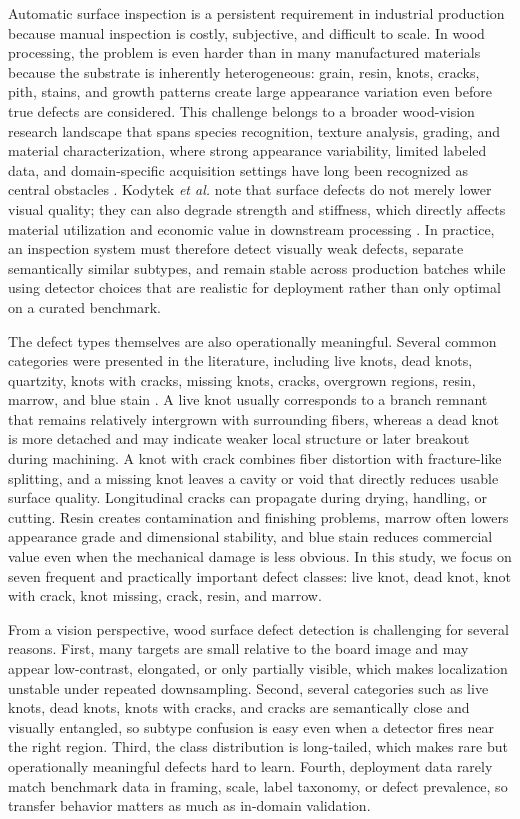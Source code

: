 \documentclass[10pt,a4paper]{article}
\begin{document}
Automatic surface inspection is a persistent requirement in industrial production because manual inspection is costly, subjective, and difficult to scale. In wood processing, the problem is even harder than in many manufactured materials because the substrate is inherently heterogeneous: grain, resin, knots, cracks, pith, stains, and growth patterns create large appearance variation even before true defects are considered. This challenge belongs to a broader wood-vision research landscape that spans species recognition, texture analysis, grading, and material characterization, where strong appearance variability, limited labeled data, and domain-specific acquisition settings have long been recognized as central obstacles \citep{hwang_sugiyama_review,da_silva_2017,souza_2020,de_geus_2021,kirbas_2022,he_2021_woodresearch,herrera_poyatos_2024}. Kodytek \textit{et al.} note that surface defects do not merely lower visual quality; they can also degrade strength and stiffness, which directly affects material utilization and economic value in downstream processing \citep{kodytek_dataset}. In practice, an inspection system must therefore detect visually weak defects, separate semantically similar subtypes, and remain stable across production batches while using detector choices that are realistic for deployment rather than only optimal on a curated benchmark.

The defect types themselves are also operationally meaningful. Several common categories were presented in the literature, including live knots, dead knots, quartzity, knots with cracks, missing knots, cracks, overgrown regions, resin, marrow, and blue stain \citep{kodytek_dataset}. A live knot usually corresponds to a branch remnant that remains relatively intergrown with surrounding fibers, whereas a dead knot is more detached and may indicate weaker local structure or later breakout during machining. A knot with crack combines fiber distortion with fracture-like splitting, and a missing knot leaves a cavity or void that directly reduces usable surface quality. Longitudinal cracks can propagate during drying, handling, or cutting. Resin creates contamination and finishing problems, marrow often lowers appearance grade and dimensional stability, and blue stain reduces commercial value even when the mechanical damage is less obvious. In this study, we focus on seven frequent and practically important defect classes: live knot, dead knot, knot with crack, knot missing, crack, resin, and marrow. 

From a vision perspective, wood surface defect detection is challenging for several reasons. First, many targets are small relative to the board image and may appear low-contrast, elongated, or only partially visible, which makes localization unstable under repeated downsampling. Second, several categories such as live knots, dead knots, knots with cracks, and cracks are semantically close and visually entangled, so subtype confusion is easy even when a detector fires near the right region. Third, the class distribution is long-tailed, which makes rare but operationally meaningful defects hard to learn. Fourth, deployment data rarely match benchmark data in framing, scale, label taxonomy, or defect prevalence, so transfer behavior matters as much as in-domain validation.
\end{document}
